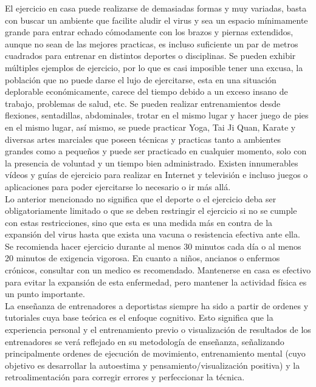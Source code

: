 El ejercicio en casa puede realizarse de demasiadas formas y muy variadas, basta con buscar un ambiente que facilite aludir el virus y sea un espacio mínimamente grande para entrar echado cómodamente con los brazos y piernas extendidos, aunque no sean de las mejores practicas, es incluso suficiente un par de metros cuadrados para entrenar en distintos deportes o disciplinas. Se pueden exhibir múltiples ejemplos de ejercicio, por lo que es casi imposible tener una excusa, la población que no puede darse el lujo de ejercitarse, esta en una situación deplorable económicamente, carece del tiempo debido a un exceso insano de trabajo, problemas de salud, etc.
Se pueden realizar entrenamientos desde flexiones, sentadillas, abdominales, trotar en el mismo lugar y hacer juego de pies en el mismo lugar, así mismo, se puede practicar Yoga, Tai Ji Quan, Karate y diversas artes marciales que poseen técnicas y practicas tanto a ambientes grandes como a pequeños y puede ser practicado en cualquier momento, solo con la presencia de voluntad y un tiempo bien administrado. Existen innumerables vídeos y guías de ejercicio para realizar en Internet y televisión e incluso juegos o aplicaciones para poder ejercitarse lo necesario o ir más allá.\\

Lo anterior mencionado no significa que el deporte o el ejercicio deba ser obligatoriamente limitado o que se deben restringir el ejercicio si no se cumple con estas restricciones, sino que esta es una medida más en contra de la expansión del virus hasta que exista una vacuna o resistencia efectiva ante ella. Se recomienda hacer ejercicio durante al menos 30 minutos cada día o al menos 20 minutos de exigencia vigorosa. En cuanto a niños, ancianos o enfermos crónicos, consultar con un medico es recomendado. Mantenerse en casa es efectivo para evitar la expansión de esta enfermedad, pero mantener la actividad física es un punto importante.\cite{Chen} \\



La enseñanza de entrenadores a deportistas siempre ha sido a partir de ordenes y tutoriales cuya base teórica es el enfoque cognitivo. Esto significa que la experiencia personal y el entrenamiento previo o visualización de resultados de los entrenadores se verá reflejado en su metodología de enseñanza, señalizando principalmente ordenes de ejecución de movimiento, entrenamiento mental (cuyo objetivo es desarrollar la autoestima y pensamiento/visualización positiva) y la retroalimentación para corregir errores y perfeccionar la técnica.\\



